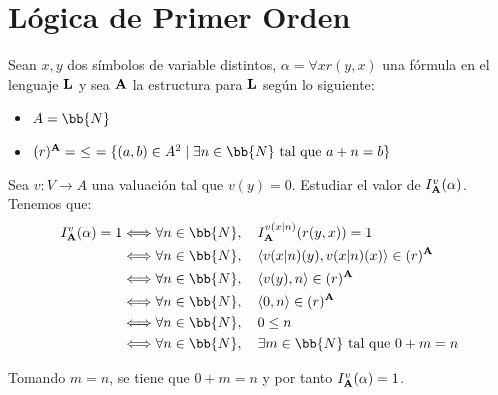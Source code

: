 \section{Lógica de Primer Orden}


\begin{ejercicio}
    Sean $x,y$ dos símbolos de variable distintos,
    $\alpha=\forall xr(y,x)$ una fórmula en el lenguaje $\bf{L}$
    y sea $\bf{A}$ la estructura para $\bf{L}$ según lo siguiente:
    \begin{itemize}
        \item $A=\bb{N}$
        \item $(r)^{\bf{A}}=~\leq~= \{(a,b)\in A^2\mid \exists n\in\bb{N} \text{ tal que } a+n=b\}$
    \end{itemize}

    Sea $v:V\to A$ una valuación tal que $v(y)=0$. Estudiar el valor de $I_{\bf{A}}^v(\alpha)$.\\

    Tenemos que:
    \begin{align*}
        I_{\bf{A}}^v(\alpha) = 1
        & \Longleftrightarrow \forall n\in \bb{N},\quad  I_{\bf{A}}^{v(x|n)}(r(y,x))=1\\
        & \Longleftrightarrow \forall n\in \bb{N},\quad  \langle v(x|n)(y),v(x|n)(x)\rangle\in (r)^{\bf{A}}\\
        & \Longleftrightarrow \forall n\in \bb{N},\quad  \langle v(y),n\rangle\in (r)^{\bf{A}}\\
        & \Longleftrightarrow \forall n\in \bb{N},\quad  \langle 0,n\rangle\in (r)^{\bf{A}}\\
        & \Longleftrightarrow \forall n\in \bb{N},\quad  0\leq n\\
        & \Longleftrightarrow \forall n\in \bb{N},\quad  \exists m\in \bb{N} \text{ tal que } 0+m=n
    \end{align*}

    Tomando $m=n$, se tiene que $0+m=n$ y por tanto $I_{\bf{A}}^v(\alpha)=1$.
\end{ejercicio}


